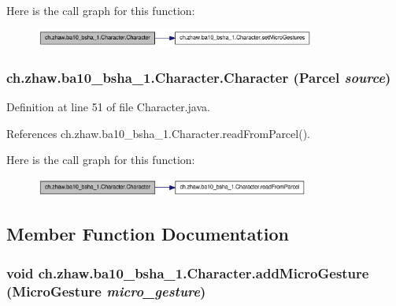 Here is the call graph for this function:\nopagebreak
\begin{figure}[H]
\begin{center}
\leavevmode
\includegraphics[width=261pt]{classch_1_1zhaw_1_1ba10__bsha__1_1_1Character_a7de6941f30f53be346af22a76e8dd455_cgraph}
\end{center}
\end{figure}
\hypertarget{classch_1_1zhaw_1_1ba10__bsha__1_1_1Character_a9610139b4634b1f6c33ed5a5fa91ba0f}{
\subsubsection[{Character}]{\setlength{\rightskip}{0pt plus 5cm}ch.zhaw.ba10\_\-bsha\_\-1.Character.Character (Parcel {\em source})}}
\label{classch_1_1zhaw_1_1ba10__bsha__1_1_1Character_a9610139b4634b1f6c33ed5a5fa91ba0f}


Definition at line 51 of file Character.java.

References ch.zhaw.ba10\_\-bsha\_\-1.Character.readFromParcel().

Here is the call graph for this function:\nopagebreak
\begin{figure}[H]
\begin{center}
\leavevmode
\includegraphics[width=256pt]{classch_1_1zhaw_1_1ba10__bsha__1_1_1Character_a9610139b4634b1f6c33ed5a5fa91ba0f_cgraph}
\end{center}
\end{figure}


\subsection{Member Function Documentation}
\hypertarget{classch_1_1zhaw_1_1ba10__bsha__1_1_1Character_a6f61da3106a54f30d804c9e4d5b03b9c}{
\subsubsection[{addMicroGesture}]{\setlength{\rightskip}{0pt plus 5cm}void ch.zhaw.ba10\_\-bsha\_\-1.Character.addMicroGesture ({\bf MicroGesture} {\em micro\_\-gesture})}}
\label{classch_1_1zhaw_1_1ba10__bsha__1_1_1Character_a6f61da3106a54f30d804c9e4d5b03b9c}


